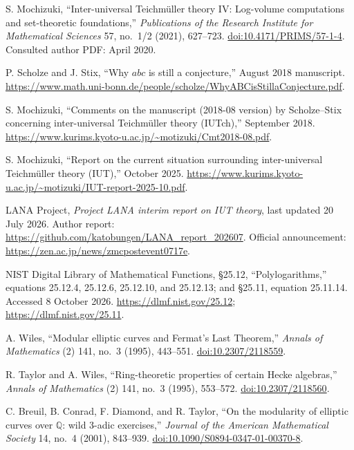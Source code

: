 S. Mochizuki,
``Inter-universal Teichm\"uller theory IV: Log-volume computations and set-theoretic foundations,''
\emph{Publications of the Research Institute for Mathematical Sciences}
57, no.~1/2 (2021), 627--723.
\href{https://doi.org/10.4171/PRIMS/57-1-4}{doi:10.4171/PRIMS/57-1-4}.
Consulted author PDF: April 2020.

P. Scholze and J. Stix,
``Why $abc$ is still a conjecture,'' August 2018 manuscript.
\url{https://www.math.uni-bonn.de/people/scholze/WhyABCisStillaConjecture.pdf}.

S. Mochizuki,
``Comments on the manuscript (2018-08 version) by Scholze--Stix concerning inter-universal Teichm\"uller theory (IUTch),'' September 2018.
\url{https://www.kurims.kyoto-u.ac.jp/~motizuki/Cmt2018-08.pdf}.

S. Mochizuki,
``Report on the current situation surrounding inter-universal Teichm\"uller theory (IUT),'' October 2025.
\url{https://www.kurims.kyoto-u.ac.jp/~motizuki/IUT-report-2025-10.pdf}.

LANA Project,
\emph{Project LANA interim report on IUT theory}, last updated 20 July 2026.
Author report: \url{https://github.com/katobungen/LANA_report_202607}.
Official announcement: \url{https://zen.ac.jp/news/zmcpostevent0717e}.

NIST Digital Library of Mathematical Functions,
\S25.12, ``Polylogarithms,'' equations 25.12.4, 25.12.6, 25.12.10, and 25.12.13;
and \S25.11, equation 25.11.14. Accessed 8 October 2026.
\url{https://dlmf.nist.gov/25.12}; \url{https://dlmf.nist.gov/25.11}.

A. Wiles,
``Modular elliptic curves and Fermat's Last Theorem,''
\emph{Annals of Mathematics} (2) 141, no.~3 (1995), 443--551.
\href{https://doi.org/10.2307/2118559}{doi:10.2307/2118559}.

R. Taylor and A. Wiles,
``Ring-theoretic properties of certain Hecke algebras,''
\emph{Annals of Mathematics} (2) 141, no.~3 (1995), 553--572.
\href{https://doi.org/10.2307/2118560}{doi:10.2307/2118560}.

C. Breuil, B. Conrad, F. Diamond, and R. Taylor,
``On the modularity of elliptic curves over $\mathbb Q$: wild 3-adic exercises,''
\emph{Journal of the American Mathematical Society} 14, no.~4 (2001), 843--939.
\href{https://doi.org/10.1090/S0894-0347-01-00370-8}{doi:10.1090/S0894-0347-01-00370-8}.

